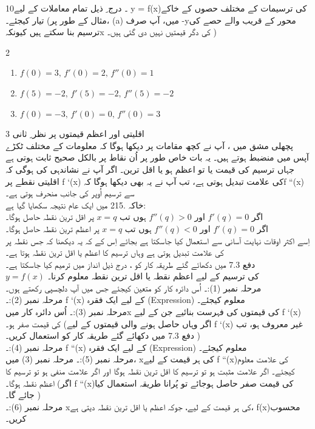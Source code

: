 10۔ درج  ِ ذیل تمام معاملات کے لیے y = f(x)کی ترسیمات کے مختلف حصوں کے خاکے تیار کیجئے۔ (مثال کے طور پر، (a) میں،  آپ صرف -yمحور کے قریب والے حصے کی ترسیم بنا سکتے ہیں کیونکہx  کی دگر قیمتیں نہیں دی گئی ہیں۔ )\\
  \begin{multicols}{2}
  \begin{enumerate}[.a]
  \item \( f(0)=3, \,  f'(0)=2, \,f''(0)=1 \)
  \item \( f(5)=-2, \, f'(5)=-2, \,f''(5)=-2 \)
  \item \( f(0)=-3, \, f'(0)=0, \,f''(0)=3\)
  \end{enumerate}
  \end{multicols}
3 اقلیتی  اور اعظم  قیمتوں پر نظر ِ ثانی \\
	پچھلی مشق میں ، آپ نے کچھ مقامات پر دیکھا ہوگا کہ معلومات کے مختلف ٹکڑے آپس میں منضبط ہوتے ہیں۔ یہ بات خاص طور پر اُن نقاط پر بالکل صحیح ثابت ہوتی ہے جہاں ترسیم کی قیمت یا تو اعظم ہو یا اقل ترین۔ اگر آپ نے نشاندہی کی ہوگی کہ اقلیتی نقطے  پر f `(x) کی علامت تبدیل ہوتی ہے، تب آپ نے یہ بھی دیکھا ہوگا کہf ``(x)  سے ترسیم اُوپر کی جانب منحرف ہوتی ہے۔ \\
	خاکہ .215 میں ایک عام نتیجہ سکھایا گیا ہے:\\
اگر   
   \(f'(q)=0\)
اور
    \(f''(q)>0\)
   ہوں تب
     \(x=q\)
       پر اقل ترین نقطہ حاصل ہوگا۔ \\
اگر 
\(f'(q)=0\)
  اور
  \(f''(q)<0\)
     ہوں تب  
        \(x=q\)
       پر اعظم ترین نقطہ حاصل ہوگا۔ \\
اِسے اکثر اوقات نہایت آسانی سے استعمال کیا جاسکتا ہے بجائے اِس کے کہ یہ دیکھنا کہ جس نقطہ پر   کی علامت تبدیل ہوتی ہے وہاں ترسیم کا اعظم یا اقل ترین نقطہ ہوتا ہے۔  \\
دفع 7.3  میں دکھائے گئے طریقہ کار کو ، درج ذیل انداز میں ترمیم کیا جاسکتا ہے۔ \\
 \(y=f(x)\)
 کی ترسیم کے لیے اعظم نقطہ یا اقل ترین نقطہ معلوم کرنا۔\\
مرحلہ نمبر (1):۔ اُس دائرہ کار کو متعین کیجئے جس میں آپ دلچسپی رکھتے ہوں۔\\
مرحلہ نمبر (2):۔ f `(x) کے لیے ایک فقرہ (Expression) معلوم کیجئے۔ \\
مرحلہ نمبر (3):۔ اُس دائرہ کار میںx  کی قیمتوں کی فہرست بنائیے جن کے لیے f `(x)  کی قیمت صفر ہو۔  (اگر وہاں حاصل ہونے والی قیمتوں کے لیے f `(x) غیر معروف  ہو، تب دفع 7.3  میں دکھائے گئے طریقہ کار کو استعمال کریں۔ )\\
مرحلہ نمبر (4):۔ f ``(x) کے لیے ایک فقرہ (Expression) معلوم کیجئے۔\\
مرحلہ نمبر (5):۔ مرحلہ نمبر (3) میں،  xکی ہر قیمت کے لیے f ``(x)کی علامت معلوم کیجئے۔ اگر علامت مثبت ہو تو ترسیم کا اقل ترین نقطہ ہوگا اور اگر علامت منفی ہو تو ترسیم کا اعظم نقطہ ہوگا۔  (اگر f ``(x)کی قیمت صفر حاصل ہوجائے تو پُرانا طریقہ استعمال کیا جائے گا۔ )\\
مرحلہ نمبر (6):۔  xکی ہر قیمت کے لیے، جوکہ اعظم یا اقل ترین نقطہ دیتی ہے، f(x)محسوب کریں۔ \\

